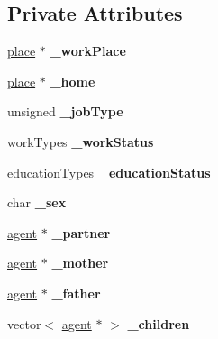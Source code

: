 \subsection*{Private Attributes}
\begin{DoxyCompactItemize}
\item 
\mbox{\label{classagent_a232bde3d6f75bac6c1fba313b7124b13}} 
\mbox{\hyperlink{classplace}{place}} $\ast$ {\bfseries \+\_\+work\+Place}
\item 
\mbox{\label{classagent_a6db9c370528e73527b4d7a8b00ffab23}} 
\mbox{\hyperlink{classplace}{place}} $\ast$ {\bfseries \+\_\+home}
\item 
\mbox{\label{classagent_a4155df9fba51d2a5387b266e74f0703e}} 
unsigned {\bfseries \+\_\+job\+Type}
\item 
\mbox{\label{classagent_a79ee05496cc1bc2d806fbb70a45d9f99}} 
work\+Types {\bfseries \+\_\+work\+Status}
\item 
\mbox{\label{classagent_abbfd4798d2b47e4b418a9aefa75fd75b}} 
education\+Types {\bfseries \+\_\+education\+Status}
\item 
\mbox{\label{classagent_ad2e0f7c2a20dcfa12f07a07520ee7e4a}} 
char {\bfseries \+\_\+sex}
\item 
\mbox{\label{classagent_a54b776c2ea81520b05c683632bed82fd}} 
\mbox{\hyperlink{classagent}{agent}} $\ast$ {\bfseries \+\_\+partner}
\item 
\mbox{\label{classagent_abff69cc5e2c8b7dcbd4c6eeeb9323a08}} 
\mbox{\hyperlink{classagent}{agent}} $\ast$ {\bfseries \+\_\+mother}
\item 
\mbox{\label{classagent_ae55ddedf072040f0cb8930217660e697}} 
\mbox{\hyperlink{classagent}{agent}} $\ast$ {\bfseries \+\_\+father}
\item 
\mbox{\label{classagent_af42fc69cd57f652287501750499c6024}} 
vector$<$ \mbox{\hyperlink{classagent}{agent}} $\ast$ $>$ {\bfseries \+\_\+children}
\end{DoxyCompactItemize}


